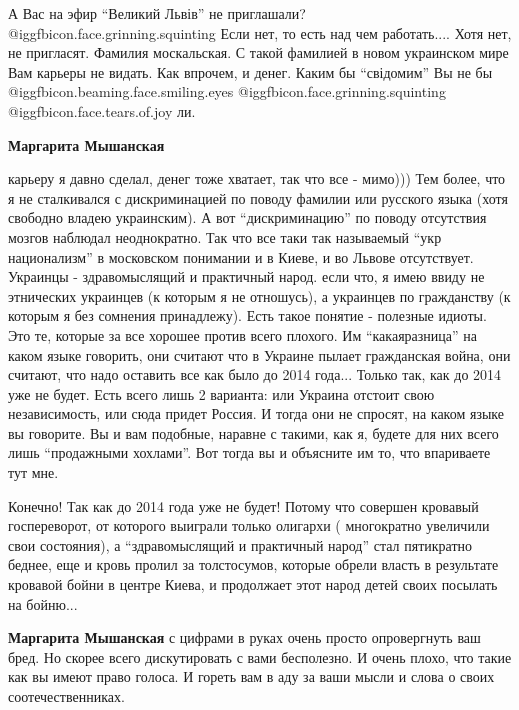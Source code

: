 \begin{itemize}
\begin{itemize}
\begin{itemize}
\end{itemize} %


А Вас на эфир \enquote{Великий Львів} не приглашали?
@igg{fbicon.face.grinning.squinting}  Если нет, то есть над чем работать....
Хотя нет, не пригласят. Фамилия москальская. С такой фамилией в новом
украинском мире Вам карьеры не видать. Как впрочем, и денег. Каким бы
\enquote{свідомим} Вы не бы @igg{fbicon.beaming.face.smiling.eyes}
@igg{fbicon.face.grinning.squinting}  @igg{fbicon.face.tears.of.joy} ли.

\begin{itemize} %
\textbf{Маргарита Мышанская} 

карьеру я давно сделал, денег тоже хватает, так что все - мимо))) Тем более,
что я не сталкивался с дискриминацией по поводу фамилии или русского языка
(хотя свободно владею украинским). А вот \enquote{дискриминацию} по поводу отсутствия
мозгов наблюдал неоднократно. Так что все таки так называемый \enquote{укр национализм}
в московском понимании и в Киеве, и во Львове отсутствует. Украинцы -
здравомыслящий и практичный народ. если что, я имею ввиду не этнических
украинцев (к которым я не отношусь), а украинцев по гражданству (к которым я
без сомнения принадлежу). Есть такое понятие - полезные идиоты. Это те, которые
за все хорошее против всего плохого. Им \enquote{какаяразница} на каком языке говорить,
они считают что в Украине пылает гражданская война, они считают, что надо
оставить все как было до 2014 года... Только так, как до 2014 уже не будет.
Есть всего лишь 2 варианта: или Украина отстоит свою независимость, или сюда
придет Россия. И тогда они не спросят, на каком языке вы говорите. Вы и вам
подобные, наравне с такими, как я, будете для них всего лишь \enquote{продажными
хохлами}. Вот тогда вы и объясните им то, что впариваете тут мне.

\end{itemize} %


Конечно! Так как до 2014 года уже не будет! Потому что совершен кровавый
госпереворот, от которого выиграли только олигархи ( многократно увеличили свои
состояния), а \enquote{здравомыслящий и практичный народ} стал пятикратно
беднее, еще и кровь пролил за толстосумов, которые обрели власть в результате
кровавой бойни в центре Киева, и продолжает этот народ детей своих посылать на
бойню...

\begin{itemize} %
\textbf{Маргарита Мышанская} с цифрами в руках очень просто опровергнуть ваш бред. Но скорее всего дискутировать с вами бесполезно. И очень плохо, что такие как вы имеют право голоса. И гореть вам в аду за ваши мысли и слова о своих соотечественниках.
\end{itemize} %


\end{itemize}
\end{itemize}
